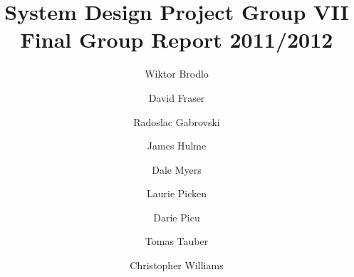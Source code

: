 \documentclass[12pt,a4paper]{article}
\begin{document}
\title{System Design Project Group VII Final Group Report 2011/2012}
\author{Wiktor Brodlo \and David Fraser \and Radoslac Gabrovski \and James
Hulme \and Dale Myers \and Laurie Picken \and Darie Picu \and Tomas Tauber \and
Christopher Williams}

\maketitle

\twocolumn











\onecolumn
\appendix




\newpage


\end{document}
